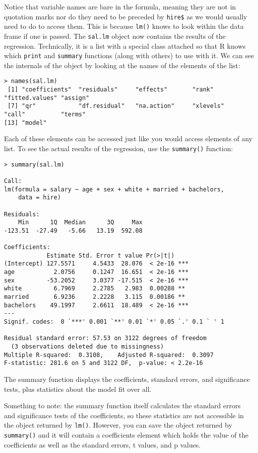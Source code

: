 \documentclass[12pt, oneside]{amsart}   	%
\begin{document}
Notice that variable names are bare in the formula, meaning they are not in quotation marks nor do they need to be preceded by \texttt{hire\$} as we would usually need to do to access them. This is because \texttt{lm()} knows to look within the data frame if one is passed. The \texttt{sal.lm} object now contains the results of the regression. Technically, it is a list with a special class attached so that R knows which \texttt{print} and \texttt{summary} functions (along with others) to use with it. We can see the internals of the object by looking at the names of the elements of the list:

\begin{verbatim}
> names(sal.lm)
 [1] "coefficients"  "residuals"     "effects"       "rank"          "fitted.values" "assign"       
 [7] "qr"            "df.residual"   "na.action"     "xlevels"       "call"          "terms"        
[13] "model"   
\end{verbatim}

Each of these elements can be accessed just like you would access elements of any list. To see the actual results of the regression, use the \texttt{summary()} function:

\begin{verbatim}> summary(sal.lm)

Call:
lm(formula = salary ~ age + sex + white + married + bachelors, 
    data = hire)

Residuals:
    Min      1Q  Median      3Q     Max 
-123.51  -27.49   -5.66   13.19  592.08 

Coefficients:
            Estimate Std. Error t value Pr(>|t|)    
(Intercept) 127.5571     4.5433  28.076  < 2e-16 ***
age           2.0756     0.1247  16.651  < 2e-16 ***
sex         -53.2052     3.0377 -17.515  < 2e-16 ***
white         6.7969     2.2785   2.983  0.00288 ** 
married       6.9236     2.2228   3.115  0.00186 ** 
bachelors    49.1997     2.6611  18.489  < 2e-16 ***
---
Signif. codes:  0 `***' 0.001 `**' 0.01 `*' 0.05 `.' 0.1 ` ' 1

Residual standard error: 57.53 on 3122 degrees of freedom
  (3 observations deleted due to missingness)
Multiple R-squared:  0.3108,	Adjusted R-squared:  0.3097 
F-statistic: 281.6 on 5 and 3122 DF,  p-value: < 2.2e-16
\end{verbatim}

The summary function displays the coefficients, standard errors, and significance tests, plus statistics about the model fit over all. 

Something to note: the summary function itself calculates the standard errors and significance tests of the coefficients, so these statistics are not accessible in the object returned by \texttt{lm()}. However, you can save the object returned by \texttt{summary()} and it will contain a coefficients element which holds the value of the coefficients as well as the standard errors, t values, and p values.
\end{document}
